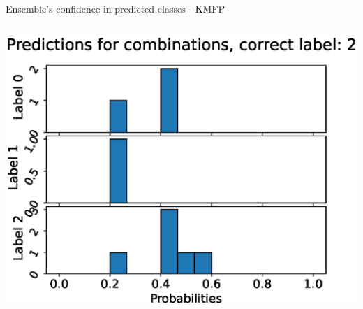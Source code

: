 \begin{frame}[fragile]{Ensemble's confidence in predicted classes - KMFP}
\begin{columns}[T,onlytextwidth]
      \includegraphics[width=\textwidth]{files/figs/res/kmfp/pc2.eps}
  \end{columns}
\end{frame}

